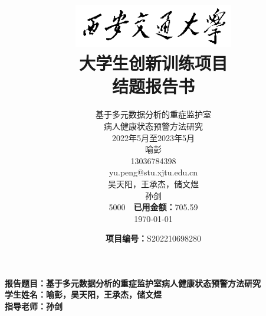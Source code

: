 \documentclass[12pt, a4paper, oneside]{ctexart}
\numberwithin{equation}{section}  %
\begin{document}
\title{
    \vspace{2cm}
    \includegraphics[width=7cm]{XJTU_logo}\\[1ex]
    \textbf{大学生创新训练项目\\[1ex]
    结题报告书} \vspace{3cm}
}
\preauthor{\begin{flushleft}\large}
\postauthor{\end{flushleft}}
\author{
    \hspace{3cm}\begin{minipage}[t]{0.65\linewidth}
基于多元数据分析的重症监护室\\
\makebox[5em][s]{}病人健康状态预警方法研究\\[1ex]
2022年5月至2023年5月\\[1ex]
喻彭\\[1ex]
13036784398\\[1ex]
yu.peng@stu.xjtu.edu.cn\\[1ex]
吴天阳，王承杰，储文煜\\[1ex]
孙剑\\[1ex]
5000\ \ \textbf{已用金额：}705.59\\[1ex]
\today
    \end{minipage}
}
\date{\vspace{-22cm}\hspace{-12cm}\textbf{项目编号：}S202210698280}
\maketitle %
\thispagestyle{titlestyle}
\clearpage %
\thispagestyle{abstructstyle}
\noindent\textbf{报告题目：基于多元数据分析的重症监护室病人健康状态预警方法研究}\\
\textbf{学生姓名：喻彭，吴天阳，王承杰，储文煜}\\
\textbf{指导老师：孙剑}\\[1em]
\end{document}

